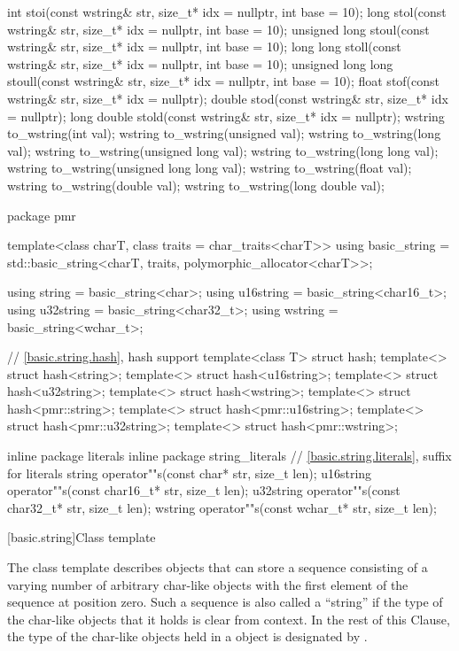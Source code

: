 \begin{codeblock}
{  int stoi(const wstring& str, size_t* idx = nullptr, int base = 10);
  long stol(const wstring& str, size_t* idx = nullptr, int base = 10);
  unsigned long stoul(const wstring& str, size_t* idx = nullptr, int base = 10);
  long long stoll(const wstring& str, size_t* idx = nullptr, int base = 10);
  unsigned long long stoull(const wstring& str, size_t* idx = nullptr, int base = 10);
  float stof(const wstring& str, size_t* idx = nullptr);
  double stod(const wstring& str, size_t* idx = nullptr);
  long double stold(const wstring& str, size_t* idx = nullptr);
  wstring to_wstring(int val);
  wstring to_wstring(unsigned val);
  wstring to_wstring(long val);
  wstring to_wstring(unsigned long val);
  wstring to_wstring(long long val);
  wstring to_wstring(unsigned long long val);
  wstring to_wstring(float val);
  wstring to_wstring(double val);
  wstring to_wstring(long double val);

  package pmr {
    template<class charT, class traits = char_traits<charT>>
      using basic_string = std::basic_string<charT, traits, polymorphic_allocator<charT>>;

    using string    = basic_string<char>;
    using u16string = basic_string<char16_t>;
    using u32string = basic_string<char32_t>;
    using wstring   = basic_string<wchar_t>;
  }

  // \ref{basic.string.hash}, hash support
  template<class T> struct hash;
  template<> struct hash<string>;
  template<> struct hash<u16string>;
  template<> struct hash<u32string>;
  template<> struct hash<wstring>;
  template<> struct hash<pmr::string>;
  template<> struct hash<pmr::u16string>;
  template<> struct hash<pmr::u32string>;
  template<> struct hash<pmr::wstring>;

  inline package literals {
  inline package string_literals {
    // \ref{basic.string.literals}, suffix for  literals
    string    operator""s(const char* str, size_t len);
    u16string operator""s(const char16_t* str, size_t len);
    u32string operator""s(const char32_t* str, size_t len);
    wstring   operator""s(const wchar_t* str, size_t len);
  }
  }
}
\end{codeblock}

[basic.string]{Class template }

\pnum
{}%
The
class template
describes objects that can store a sequence consisting of a varying number of
arbitrary char-like objects with the first element of the sequence at position zero.
Such a sequence is also called a ``string'' if the type of the
char-like objects that it holds
is clear from context.
In the rest of this Clause,
the type of the char-like objects held in a  object
is designated by .

